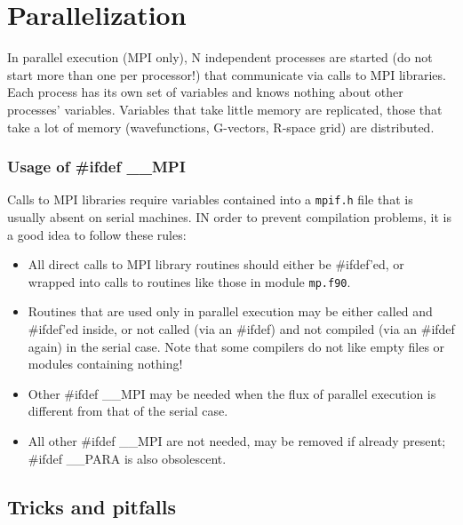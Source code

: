 \documentclass[12pt,a4paper]{article}
\begin{document}
\section{Parallelization}

In parallel execution (MPI only), N independent processes are started
(do not start more than one per processor!) that communicate via calls
to MPI libraries. Each process has its own set of variables and knows
nothing about other processes' variables. Variables that take little memory 
are replicated, those that take a lot of memory (wavefunctions, G-vectors, 
R-space grid) are distributed.
    
\subsubsection{Usage of \#ifdef \_\_MPI}
Calls to MPI libraries require variables contained into a 
\texttt{mpif.h} file that is usually absent on serial machines.
IN order to prevent compilation problems, it is a good idea to
follow these rules:
\begin{itemize}
\item All direct calls to MPI library routines should either be 
\#ifdef'ed, or wrapped into calls to routines like those in
module \texttt{mp.f90}.
\item Routines that are used only in parallel execution may be either
called and \#ifdef'ed inside, or not called (via an \#ifdef) and not 
compiled (via an \#ifdef again) in the serial case. Note that
some compilers do not like empty files or modules containing nothing!
\item Other \#ifdef \_\_MPI may be needed when the flux of parallel
execution is different from that of the serial case.
\item All other \#ifdef \_\_MPI are not needed, may be removed if
already present; \#ifdef \_\_PARA is also obsolescent.
\end{itemize}

\subsection{Tricks and pitfalls}
\end{document}
